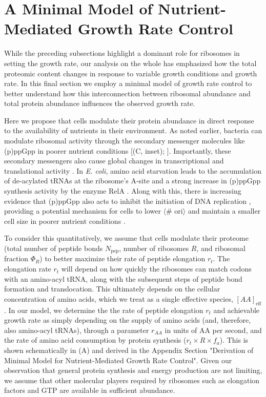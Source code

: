 \section{A Minimal Model of Nutrient-Mediated Growth Rate Control}
\label{sec:minimal_model}
While the preceding subsections highlight a dominant role for ribosomes in
setting the growth rate, our analysis on the whole has emphasized how the total
proteomic content changes in response to variable growth conditions and
growth rate. In this final section we employ a minimal model of growth rate control
to better understand how this interconnection between ribosomal abundance and
total protein abundance influences the observed growth rate.

Here we propose that cells modulate their protein abundance in direct response
to the availability of nutrients in their environment. As noted earlier,
bacteria can modulate ribosomal activity through the secondary messenger
molecules like (p)ppGpp in poorer nutrient conditions [(C,
inset); \cite{dai2016}]. Importantly, these secondary messengers also cause
global changes in transcriptional and translational activity
\citep{hauryliuk2015, zhu2019, Buke2020}. In \textit{E. coli}, amino acid
starvation leads to the accumulation of de-acylated tRNAs at the ribosome's
A-site and a strong increase in (p)ppGpp synthesis activity by the enzyme RelA
\citep{hauryliuk2015}. Along with this,  there is increasing evidence that
(p)ppGpp also acts to inhibit the initiation of DNA replication
\citep{kraemer2019}, providing a potential mechanism for cells to lower $\langle$\#
ori$\rangle$ and maintain a smaller cell size in poorer nutrient conditions
\citep{fernandezcoll2020}.

To consider this quantitatively, we assume that cells modulate their proteome
(total number of peptide bonds $N_\text{pep}$, number of ribosomes $R$, and
ribosomal fraction $\Phi_R$) to better maximize their rate of peptide elongation
$r_t$. The elongation rate $r_t$ will depend on how quickly the ribosomes can
match codons with an amino-acyl tRNA, along with the subsequent steps of peptide
bond formation and translocation. This ultimately depends on the cellular
concentration of amino acids, which we treat as a single effective species,
$[AA]_\text{eff}$. In our model, we determine the the rate of peptide elongation
$r_t$ and achievable growth rate as simply depending on the supply of amino
acids (and, therefore, also amino-acyl tRNAs), through a parameter $r_{AA}$ in
units of AA per second, and the rate of amino acid consumption by protein
synthesis ($r_t \times R \times f_a$). This is shown schematically in
(A) and derived in the Appendix Section "Derivation
of Minimal Model for Nutrient-Mediated Growth Rate Control". Given our
observation that general protein synthesis and energy production are not limiting, we
assume that other molecular players required by ribosomes such as elongation
factors and GTP are available in sufficient abundance.

